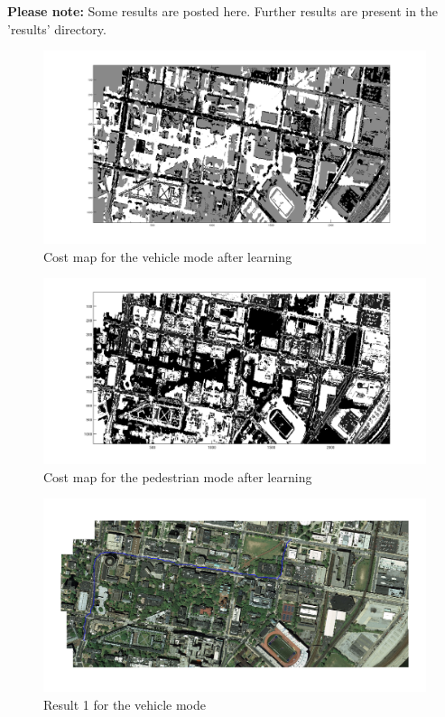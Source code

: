 \documentclass[english]{article}
\begin{document}
\textbf{Please note: } Some results are posted here. Further results are present in the 'results' directory. 


\begin{figure}[thpb]
\centering
\includegraphics[width=\textwidth]{costMapVeh}
\caption{Cost map for the vehicle mode after learning}
\end{figure}

\begin{figure}[thpb]
\centering
\includegraphics[width=\textwidth]{costMapPed}
\caption{Cost map for the pedestrian mode after learning}
\end{figure}

\begin{figure}[thpb]
\centering
\includegraphics[width=\textwidth]{veh_1}
\caption{Result 1 for the vehicle mode}
\end{figure}
\end{document}
